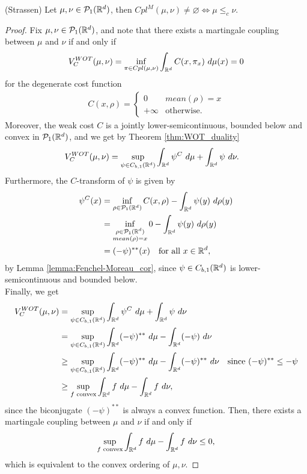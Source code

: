 \documentclass[../main.tex]{subfiles}
\begin{document}
\begin{theorem} (Strassen)
    Let $\mu, \nu\in\mathcal{P}_1(\mathbb{R}^d)$, then $Cpl^M(\mu, \nu) \neq \varnothing \iff \mu \leq_c \nu$.
\end{theorem}
\begin{proof}
    Fix $\mu, \nu\in \mathcal{P}_1(\mathbb{R}^d)$, and note that there exists a martingale coupling between $\mu$ and $\nu$ if and only if 
    $$
    V^{WOT}_C(\mu, \nu) = \inf_{\pi\in Cpl(\mu , \nu)} \int_{\mathbb{R}^d} C(x, \pi_x) \ d \mu(x) = 0
    $$
    for the degenerate cost function
    \begin{align*}
        C(x, \rho) = 
        \begin{cases}
            0 & mean(\rho) = x \\
            +\infty & \text{otherwise}.
        \end{cases}
    \end{align*}
    Moreover, the weak cost $C$ is a jointly lower-semicontinuous, bounded below and convex in $\mathcal{P}_1(\mathbb{R}^d)$, and we get by Theorem \ref{thm:WOT_duality}
    \begin{align*}
        V^{WOT}_C(\mu, \nu) 
        &= \sup_{\psi\in C_{b,1}(\mathbb{R}^d)} \int_{\mathbb{R}^d} \psi^C \ d \mu + \int_{\mathbb{R}^d} \psi \ d \nu.
    \end{align*}
    Furthermore, the $C$-transform of $\psi$ is given by
    \begin{align*}
        \psi^C(x) 
        &= \inf_{\rho\in\mathcal{P}_1(\mathbb{R}^d)} C(x, \rho) - \int_{\mathbb{R}^d} \psi(y) \ d \rho(y) \\
        &=  \inf_{\substack{\rho\in\mathcal{P}_1(\mathbb{R}^d) \\ mean(\rho) = x}} 0 - \int_{\mathbb{R}^d} \psi(y) \ d \rho(y) \\
        &= (-\psi)^{**}(x) \quad \text{for all } x\in\mathbb{R}^d,
    \end{align*}
    by Lemma \ref{lemma:Fenchel-Moreau_cor}, since $\psi\in C_{b, 1}(\mathbb{R}^d)$ is lower-semicontinuous and bounded below. \\
    Finally, we get
    \begin{align*}
        V^{WOT}_C(\mu, \nu) 
        &= \sup_{\psi\in C_{b,1}(\R^d)} \int_{\R^d} \psi^C \ d \mu + \int_{\R^d} \psi \ d \nu \\
        &= \sup_{\psi\in C_{b,1}(\R^d)} \int_{\R^d} (-\psi)^{**} \ d \mu - \int_{\R^d} (-\psi) \ d \nu \\
        &\geq \sup_{\psi\in C_{b,1}(\R^d)} \int_{\R^d} (-\psi)^{**} \ d \mu - \int_{\R^d} (-\psi)^{**} \ d \nu \quad \text{since } (-\psi)^{**}\leq -\psi \\
        &\geq \sup_{\substack{f \text{ convex}}} \int_{\R^d} f \ d\mu - \int_{\R^d} f \ d \nu,
    \end{align*}
    since the biconjugate $(-\psi)^{**}$ is always a convex function. Then, there exists a martingale coupling between $\mu$ and $\nu$ if and only if $$ \sup_{\substack{f \text{ convex}}} \int_{\mathbb{R}^d} f \ d\mu - \int_{\mathbb{R}^d} f \ d \nu \leq 0,$$ which is equivalent to the convex ordering of $\mu, \nu$.
\end{proof}
\end{document}
